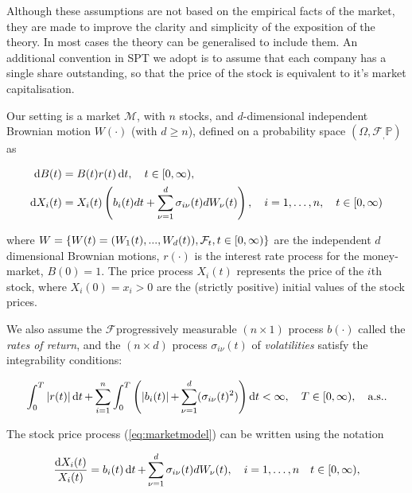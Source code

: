 \documentclass[british]{amsart} \usepackage{lmodern}
\numberwithin{equation}{section} \numberwithin{figure}{section}
\theoremstyle{plain} \newtheorem{thm}{\protect\theoremname}[section]
\theoremstyle{definition} \newtheorem{defn}[thm]{\protect\definitionname}
\theoremstyle{plain} \newtheorem{assumption}[thm]{\protect\assumptionname}
\theoremstyle{plain} \newtheorem{lem}[thm]{\protect\lemmaname}
\theoremstyle{plain} \newtheorem{prop}[thm]{\protect\propositionname}
\theoremstyle{remark} \newtheorem{rem}[thm]{\protect\remarkname}
\theoremstyle{plain} \newtheorem{cor}[thm]{\protect\corollaryname}
\renewcommand{\d}[1]{\mathop{\mathrm{d}{#1}}}
\newcommand{\filtration}[1]{\mathcal{F}_{#1}}
\newcommand{\abs}[1]{\mathop{|{#1}|}} \newcommand{\market}{\mathcal{M}}
\newcommand{\rangei}{i=1,\dots,n} \newcommand{\measure}{\mathbb{P}}
\newcommand{\probabilityspace}{(\Omega,\filtration,\measure)}
\begin{document}
Although these assumptions are not based on the empirical facts of the market,
they are made to improve the clarity and simplicity of the exposition of the
theory. In most cases the theory can be generalised to include them. An
additional convention in SPT we adopt is to assume that each company has a
single share outstanding, so that the price of the stock is equivalent to it's
market capitalisation.

Our setting is a market $\market$, with $n$ stocks, and $d$-dimensional
independent Brownian motion $W(\cdot)$ (with $d \ge n$), defined on a
probability space $\probabilityspace$ as

\begin{gather}
  \label{eq:marketmodel}
  \begin{split}
    \d{B(t)} &= B(t)r(t)\d{t},  
      \quad \ranget, \\
    \d{X_{i}(t)} &= 
          X_{i}(t) 
          \left(
              b_{i}(t)dt + \sum_{\nu=1}^{d} \sigma_{i\nu}(t) dW_{\nu}(t)
          \right),
      \quad \rangei,
      \quad \ranget
  \end{split}
\end{gather}

where $W = \left\{ W(t)=(W_{1}(t),...,W_{d}(t)),\filtration{t},\ranget \right\}$
are the independent $d$dimensional Brownian motions, $r(\cdot)$ is the
interest rate process for the money-market, $B(0)=1$. The price process
$X_{i}(t)$ represents the price of the $i$th stock, where $X_{i}(0) = x_{i} > 0$
are the (strictly positive) initial values of the stock prices.

We also assume the $\filtration{}$progressively measurable $(n \times 1)$
process $b(\cdot)$ called the \textit{rates of return}, and the $(n \times d)$
process $\sigma_{i\nu}(t)$ of \textit{volatilities} satisfy the integrability
conditions: 

\begin{equation*}
  \int_{0}^{T} 
  \abs{r(t)} 
  \d{t} +
  \sum_{i=1}^{n} \int_{0}^{T} 
    \left( 
        \abs{b_{i}(t)} +
        \sum_{\nu=1}^{d} ( \sigma_{i\nu}(t)^2  ) 
        \right) \d{t} < \infty,
  \quad T \in [0, \infty),
  \quad \almostsurely.
  \end{equation*}


The stock price process (\ref{eq:marketmodel}) can be written using the notation 

\begin{equation}
  \label{eq:stockpriceprocessdiff}
    \frac{\d{X_{i}(t)}}{X_{i}(t)} = b_{i}(t)\d{t} + \sum_{\nu=1}^{d} \sigma_{i\nu}(t) dW_{\nu}(t),
  \quad \rangei
  \quad \ranget,
\end{equation}
\end{document}

